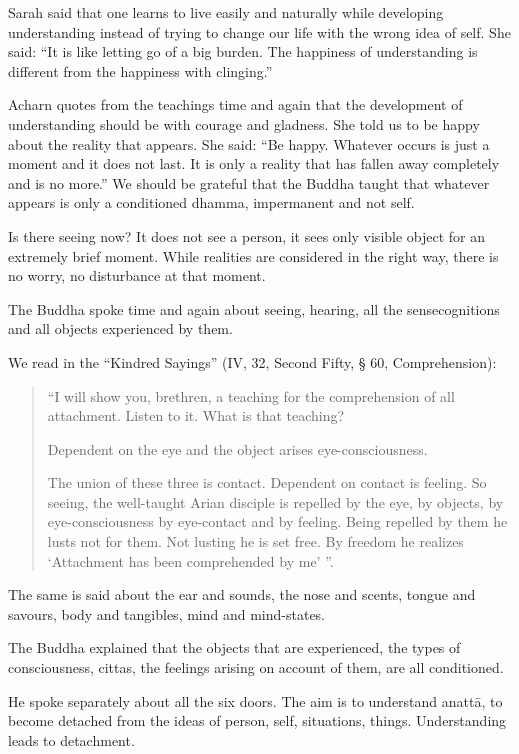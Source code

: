Sarah said that one learns to live easily and naturally while developing understanding instead of trying to change our life with the wrong idea of self. She 
said: ``It is like letting go of a big burden. The happiness of understanding is different from the happiness with clinging.'' 

Acharn quotes from the teachings time and again that the development of understanding should be with courage and gladness. She told us to be happy about 
the reality that appears. She said: ``Be happy. Whatever occurs is just a moment 
and it does not last. It is only a reality that has fallen away completely and is no 
more.'' We should be grateful that the Buddha taught that whatever appears is 
only a conditioned dhamma, impermanent and not self. 

Is there seeing now? It does not see a person, it sees only visible object for an 
extremely brief moment. While realities are considered in the right way, there is 
no worry, no disturbance at that moment. 

The Buddha spoke time and again about seeing, hearing, all the sensecognitions and all objects experienced by them. 

We read in the ``Kindred Sayings'' (IV, 32, Second Fifty, § 60, Comprehension): 

\begin{quote}
``I will show you, brethren, a teaching for the comprehension of 
all attachment. Listen to it. What is that teaching? 

Dependent on the eye and the object arises eye-consciousness. 

The union of these three is contact. Dependent on contact is feeling. So seeing, the well-taught Arian disciple is repelled by the 
eye, by objects, by eye-consciousness by eye-contact and by 
feeling. Being repelled by them he lusts not for them. Not lusting he is set free. By freedom he realizes `Attachment has been 
comprehended by me' ''. 
\end{quote}

The same is said about the ear and sounds, the nose and scents, tongue and savours, body and tangibles, mind and mind-states. 

The Buddha explained that the objects that are experienced, the types of consciousness, cittas, the feelings arising on account of them, are all conditioned. 

He spoke separately about all the six doors. The aim is to understand anattā, to 
become detached from the ideas of person, self, situations, things. Understanding leads to detachment. 


